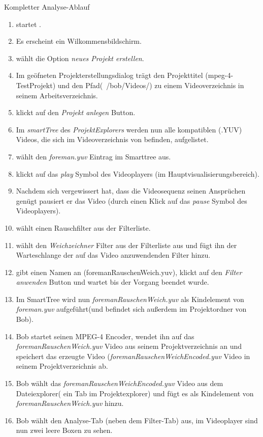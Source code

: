  Kompletter Analyse-Ablauf
\begin{enumerate}
\item \dAU startet \projektTitel.
\item Es erscheint ein Wilkommensbildschirm.
\item \dAU wählt die Option \emph{neues Projekt erstellen}.
\item Im geöfneten Projekterstellungsdialog trägt \dAU den Projekttitel (mpeg-4-TestProjekt) und den Pfad(~/bob/Videos/) zu einem Videoverzeichnis in seinem Arbeitsverzeichnis.
\item \dAU klickt auf den \emph{Projekt anlegen} Button.
\item Im \emph{smartTree} des \emph{ProjektExplorers} werden nun alle kompatiblen (.YUV) Videos, die sich
im Videoverzeichnis von \dAU befinden, aufgelistet.
\item \dAU wählt den \emph{foreman.yuv} Eintrag im Smarttree aus.
\item \dAU klickt auf das \emph{play} Symbol des Videoplayers (im Hauptvisualisierungsbereich).
\item Nachdem \dAU sich vergewissert hat, dass die Videosequenz seinen Ansprüchen genügt pausiert er
das Video (durch einen Klick auf das \emph{pause} Symbol des Videoplayers).
\item \dAU wählt einen Rauschfilter aus der Filterliste.
\item \dAU wählt den \emph{Weichzeichner} Filter aus der Filterliste aus und fügt ihn der Warteschlange der auf das Video anzuwendenden Filter hinzu.
\item \dAU gibt einen Namen an (foremanRauschenWeich.yuv), klickt auf den \emph{Filter anwenden} Button und wartet bis der Vorgang beendet wurde.
\item Im SmartTree wird nun \emph{foremanRauschenWeich.yuv} als Kindelement von \emph{foreman.yuv} aufgeführt(und befindet sich außerdem im Projektordner von Bob).
\item Bob startet seinen MPEG-4 Encoder, wendet ihn auf das \emph{foremanRauschenWeich.yuv} Video aus seinem Projektverzeichnis an und speichert das erzeugte Video (\emph{foremanRauschenWeichEncoded.yuv} Video in seinem Projektverzeichnis ab.
\item Bob wählt das \emph{foremanRauschenWeichEncoded.yuv} Video aus dem Dateiexplorer( ein Tab im Projektexplorer) und fügt es als Kindelement von \emph{foremanRauschenWeich.yuv} hinzu.
\item Bob wählt den Analyse-Tab (neben dem Filter-Tab) aus, im Videoplayer sind nun zwei leere Boxen zu sehen.

\end{enumerate}
